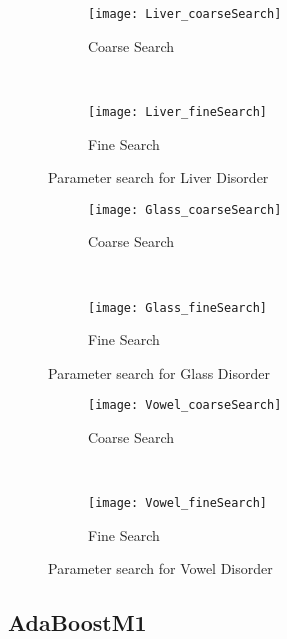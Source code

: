 \begin{figure*}[ht!]
	\centering
	\begin{subfigure}[b]{0.45\textwidth}
		\centering
		\texttt{[image: Liver\_coarseSearch]}
        \caption{Coarse Search}
	\end{subfigure}%
	~
	\begin{subfigure}[b]{0.45\textwidth}
		\centering
		\texttt{[image: Liver\_fineSearch]}
        \caption{Fine Search}
	\end{subfigure}	
	\caption{Parameter search for Liver Disorder}
	\label{fig:ParamLiver}

	\begin{subfigure}[b]{0.45\textwidth}
		\centering
		\texttt{[image: Glass\_coarseSearch]}
        \caption{Coarse Search}
	\end{subfigure}%
	~
	\begin{subfigure}[b]{0.45\textwidth}
		\centering
		\texttt{[image: Glass\_fineSearch]}
        \caption{Fine Search}
	\end{subfigure}	
	\caption{Parameter search for Glass Disorder}
	\label{fig:ParamGlass}

	\begin{subfigure}[b]{0.45\textwidth}
		\centering
		\texttt{[image: Vowel\_coarseSearch]}
        \caption{Coarse Search}
	\end{subfigure}%
	~
	\begin{subfigure}[b]{0.45\textwidth}
		\centering
		\texttt{[image: Vowel\_fineSearch]}
        \caption{Fine Search}
	\end{subfigure}	
	\caption{Parameter search for Vowel Disorder}
	\label{fig:ParamVowel}
\end{figure*}

\subsection{AdaBoostM1}
